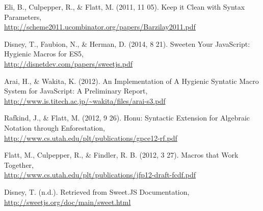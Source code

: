 %
%
%
%
\begin{thebibliography}{10}

 Eli, B., Culpepper, R., \& Flatt, M. (2011, 11 05). Keep it Clean with Syntax Parameters,\\
\url{http://scheme2011.ucombinator.org/papers/Barzilay2011.pdf}

 Disney, T., Faubion, N., \& Herman, D. (2014, 8 21). Sweeten Your JavaScript: Hygienic Macros for ES5,\\
\url{http://disnetdev.com/papers/sweetjs.pdf}

 Arai, H., \& Wakita, K. (2012). An Implementation of A Hygienic Syntatic Macro System for JavaScript: A Preliminary Report,\\
\url{http://www.is.titech.ac.jp/~wakita/files/arai-s3.pdf}

 Rafkind, J., \& Flatt, M. (2012, 9 26). Honu: Syntactic Extension for Algebraic Notation through Enforestation,\\
\url{http://www.cs.utah.edu/plt/publications/gpce12-rf.pdf}

 Flatt, M., Culpepper, R., \& Findler, R. B. (2012, 3 27). Macros that Work Together,\\
\url{http://www.cs.utah.edu/plt/publications/jfp12-draft-fcdf.pdf}

 Disney, T. (n.d.). Retrieved from Sweet.JS Documentation,\\
\url{http://sweetjs.org/doc/main/sweet.html}

\end{thebibliography}
